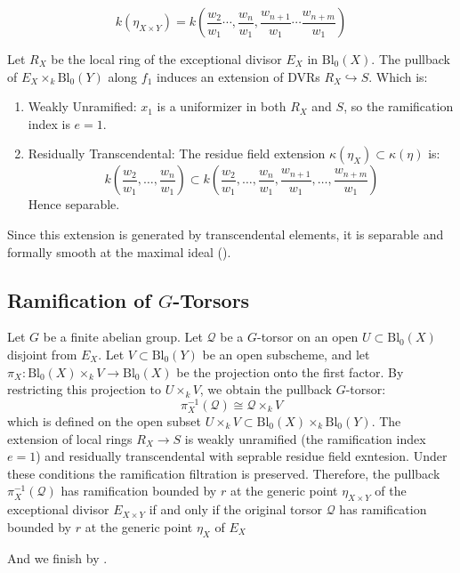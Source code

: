 $$k(\eta_{X \times Y}) = k\left(\frac{w_2}{w_1} \cdots, \frac{w_n}{w_1}, \frac{w_{n+1}}{w_1} \cdots \frac{w_{n+m}}{w_1}\right)$$

Let $R_X$ be the local ring of the exceptional divisor $E_X$ in $\text{Bl}_0(X)$. 
The pullback of $E_X \times_k \text{Bl}_0(Y)$ along $f_1$ induces an extension of DVRs $R_X \hookrightarrow S$. Which is:
\begin{enumerate}
    \item Weakly Unramified: $x_1$ is a uniformizer in both $R_X$ and $S$, so the ramification index is $e=1$.
    \item Residually Transcendental: The residue field extension $\kappa(\eta_X) \subset \kappa(\eta)$ is:
    $$k\left(\frac{w_2}{w_1}, \dots, \frac{w_n}{w_1}\right) \subset k\left(\frac{w_2}{w_1}, \dots, \frac{w_n}{w_1}, \frac{w_{n+1}}{w_1}, \dots, \frac{w_{n+m}}{w_1}\right)$$
    Hence separable.
\end{enumerate}
Since this extension is generated by transcendental elements, it is separable and formally smooth at the maximal ideal ().

\subsection*{Ramification of $G$-Torsors}
Let $G$ be a finite abelian group. 
Let $\mathcal{Q}$ be a $G$-torsor on an open $U \subset \text{Bl}_0(X)$ disjoint from $E_X$. 
Let $V \subset \text{Bl}_0(Y)$ be an open subscheme, and let $\pi_X: \text{Bl}_0(X) \times_k V \to \text{Bl}_0(X)$ 
be the projection onto the first factor. 
By restricting this projection to $U \times_k V$, we obtain the pullback $G$-torsor:
$$\pi_X^{-1}(\mathcal{Q}) \cong \mathcal{Q} \times_k V$$
which is defined on the open subset $U \times_k V \subset \text{Bl}_0(X) \times_k \text{Bl}_0(Y)$.
The extension of local rings $R_X \to S$ is weakly unramified (the ramification index $e=1$) and residually transcendental with seprable residue field exntesion. 
Under these conditions the ramification filtration is preserved. 
Therefore, the pullback $\pi_X^{-1}(\mathcal{Q})$ has ramification bounded by $r$ at the generic point $\eta_{X \times Y}$ of the exceptional divisor $E_{X \times Y}$ if and only if 
the original torsor $\mathcal{Q}$ has ramification bounded by $r$ at the generic point $\eta_X$ of $E_X$

And we finish by .
